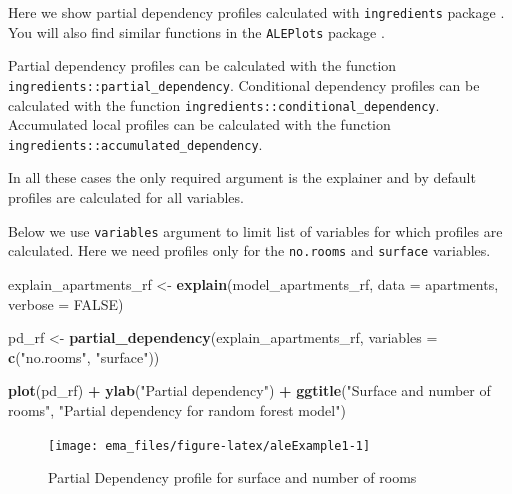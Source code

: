 \documentclass[12pt,]{krantz}
\newenvironment{Shaded}{\begin{snugshade}}{\end{snugshade}}
\newcommand{\DataTypeTok}[1]{\textcolor[rgb]{0.13,0.29,0.53}{#1}}
\newcommand{\KeywordTok}[1]{\textcolor[rgb]{0.13,0.29,0.53}{\textbf{#1}}}
\newcommand{\NormalTok}[1]{#1}
\newcommand{\OperatorTok}[1]{\textcolor[rgb]{0.81,0.36,0.00}{\textbf{#1}}}
\newcommand{\OtherTok}[1]{\textcolor[rgb]{0.56,0.35,0.01}{#1}}
\newcommand{\StringTok}[1]{\textcolor[rgb]{0.31,0.60,0.02}{#1}}
\begin{document}
Here we show partial dependency profiles calculated with \texttt{ingredients} package \citep{ingredientsRPackage}. You will also find similar functions in the \texttt{ALEPlots} package \citep{ALEPlotRPackage}.

Partial dependency profiles can be calculated with the function \texttt{ingredients::partial\_dependency}.
Conditional dependency profiles can be calculated with the function \texttt{ingredients::conditional\_dependency}.
Accumulated local profiles can be calculated with the function \texttt{ingredients::accumulated\_dependency}.

In all these cases the only required argument is the explainer and by default profiles are calculated for all variables.

Below we use \texttt{variables} argument to limit list of variables for which profiles are calculated. Here we need profiles only for the \texttt{no.rooms} and \texttt{surface} variables.

\begin{Shaded}
\begin{Highlighting}[]
\NormalTok{explain_apartments_rf <-}\StringTok{ }\KeywordTok{explain}\NormalTok{(model_apartments_rf, }
                                 \DataTypeTok{data =}\NormalTok{ apartments,}
                                 \DataTypeTok{verbose =} \OtherTok{FALSE}\NormalTok{)}

\NormalTok{pd_rf <-}\StringTok{ }\KeywordTok{partial_dependency}\NormalTok{(explain_apartments_rf, }\DataTypeTok{variables =} \KeywordTok{c}\NormalTok{(}\StringTok{"no.rooms"}\NormalTok{, }\StringTok{"surface"}\NormalTok{))}

\KeywordTok{plot}\NormalTok{(pd_rf) }\OperatorTok{+}\StringTok{ }\KeywordTok{ylab}\NormalTok{(}\StringTok{"Partial dependency"}\NormalTok{) }\OperatorTok{+}
\StringTok{  }\KeywordTok{ggtitle}\NormalTok{(}\StringTok{"Surface and number of rooms"}\NormalTok{, }\StringTok{"Partial dependency for random forest model"}\NormalTok{) }
\end{Highlighting}
\end{Shaded}

\begin{figure}

{\centering \texttt{[image: ema\_files/figure-latex/aleExample1-1]} 

}

\caption{Partial Dependency profile for surface and number of rooms}\label{fig:aleExample1}
\end{figure}
\end{document}
